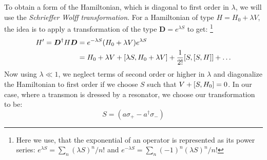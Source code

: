 To obtain a form of the Hamiltonian, which is diagonal to first order in $\lambda$, we will use the \textit{Schrieffer Wolff transformation}. For a Hamiltonian of type $H = H_0 + \lambda V$, the idea is to apply a transformation of the type $\boldsymbol{D} = e^{\lambda S}$ to get: \footnote{Here we use, that the exponential of an operator is represented as its power series: $e^{\lambda S} = \sum_n (\lambda S)^n / n!$ and $e^{-\lambda  S} = \sum_n (-1)^n (\lambda S)^n / n!$}
\begin{align*}
    H' = \boldsymbol{D}^\dagger H \boldsymbol{D} &= e^{-\lambda S} (H_0 + \lambda V) e^{\lambda  S} \\
    &= H_0 + \lambda V + \comm{\lambda S}{H_0 + \lambda V} + \frac{1}{2!} \comm{S}{\comm{S}{H}} + \dots
\end{align*}
Now using $\lambda \ll 1$, we neglect terms of second order or higher in $\lambda$ and  diagonalize the Hamiltonian to first order if we choose $S$ such that $V + \comm{S}{H_0} = 0$. In our case, where a transmon is dressed by a resonator, we choose our transformation to be:
\begin{equation}
    S = (a \sigma_+ - a^\dagger \sigma_-)
\end{equation}
